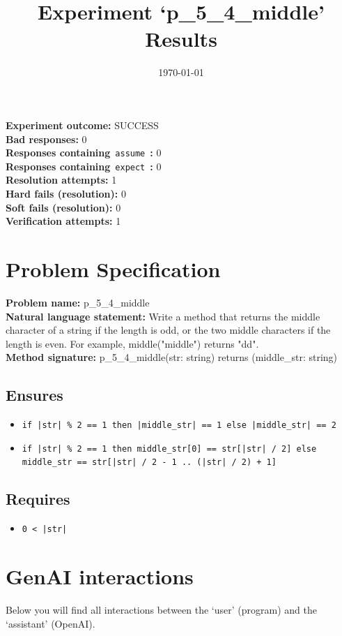 \documentclass{article}
\begin{document}
\title{Experiment `p\_5\_4\_middle' Results}
\author{\today}
\date{}
\maketitle
\textbf{Experiment outcome: }SUCCESS
\\\textbf{Bad responses: }0
\\\textbf{Responses containing}~\texttt{assume}~\textbf{: }0
\\\textbf{Responses containing}~\texttt{expect}~\textbf{: }0
\\\textbf{Resolution attempts: }1
\\\textbf{Hard fails (resolution): }0
\\\textbf{Soft fails (resolution): }0
\\\textbf{Verification attempts: }1
\section*{Problem Specification}
\textbf{Problem name: }p\_5\_4\_middle
\\\textbf{Natural language statement: }Write a method that returns the middle character of a string if the length is odd, or the two middle characters if the length is even. For example, middle("middle") returns "dd".
\\\textbf{Method signature: }p\_5\_4\_middle(str: string) returns (middle\_str: string)
\subsection*{Ensures}
\begin{itemize}
\item \texttt{if |str| \% 2 == 1 then |middle\_str| == 1 else |middle\_str| == 2}
\item \texttt{if |str| \% 2 == 1 then middle\_str[0] == str[|str| / 2] else middle\_str == str[|str| / 2 - 1 .. (|str| / 2) + 1]}
\end{itemize}
\subsection*{Requires}
\begin{itemize}
\item \texttt{0 < |str|}
\end{itemize}
\clearpage
\section*{GenAI interactions}
Below you will find all interactions between the `user' (program) and the `assistant' (OpenAI).
\end{document}
